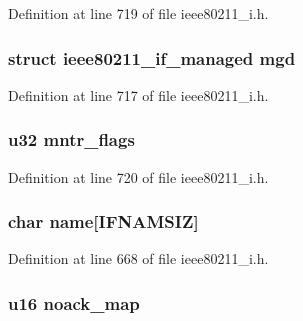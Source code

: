 Definition at line 719 of file ieee80211\-\_\-i.\-h.

\hypertarget{structieee80211__sub__if__data_ac43070ed59c628dcab245dc2dbaa0fd7}{
\subsubsection[{mgd}]{\setlength{\rightskip}{0pt plus 5cm}struct {\bf ieee80211\-\_\-if\-\_\-managed} mgd}}\label{structieee80211__sub__if__data_ac43070ed59c628dcab245dc2dbaa0fd7}


Definition at line 717 of file ieee80211\-\_\-i.\-h.

\hypertarget{structieee80211__sub__if__data_a65a8ca3269e0e7023f6f265ee9ad1535}{
\subsubsection[{mntr\-\_\-flags}]{\setlength{\rightskip}{0pt plus 5cm}u32 mntr\-\_\-flags}}\label{structieee80211__sub__if__data_a65a8ca3269e0e7023f6f265ee9ad1535}


Definition at line 720 of file ieee80211\-\_\-i.\-h.

\hypertarget{structieee80211__sub__if__data_a9ea12d6fc5b2c586092468ee1a86162a}{
\subsubsection[{name}]{\setlength{\rightskip}{0pt plus 5cm}char name\mbox{[}I\-F\-N\-A\-M\-S\-I\-Z\mbox{]}}}\label{structieee80211__sub__if__data_a9ea12d6fc5b2c586092468ee1a86162a}


Definition at line 668 of file ieee80211\-\_\-i.\-h.

\hypertarget{structieee80211__sub__if__data_a151051cbbca12c85e61578f27ae99ced}{
\subsubsection[{noack\-\_\-map}]{\setlength{\rightskip}{0pt plus 5cm}u16 noack\-\_\-map}}\label{structieee80211__sub__if__data_a151051cbbca12c85e61578f27ae99ced}


